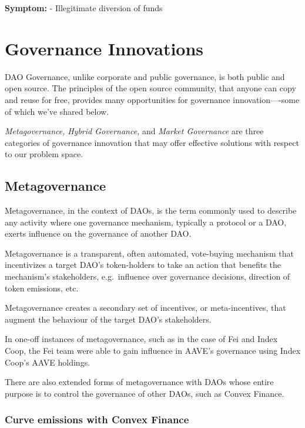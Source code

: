 \documentclass[
]{article}
\begin{document}
\textbf{Symptom:} - Illegitimate diversion of funds
\hypertarget{governance-innovations}{%
\section{Governance Innovations}\label{governance-innovations}}

DAO Governance, unlike corporate and public governance, is both public
and open source. The principles of the open source community, that
anyone can copy and reuse for free, provides many opportunities for
governance innovation----some of which we've shared below.

\emph{Metagovernance,} \emph{Hybrid Governance,} and \emph{Market
Governance} are three categories of governance innovation that may offer
effective solutions with respect to our problem space.

\hypertarget{metagovernance}{%
\subsection{Metagovernance}\label{metagovernance}}

Metagovernance, in the context of DAOs, is the term commonly used to
describe any activity where one governance mechanism, typically a
protocol or a DAO, exerts influence on the governance of another DAO.

Metagovernance is a transparent, often automated, vote-buying mechanism
that incentivizes a target DAO's token-holders to take an action that
benefits the mechanism's stakeholders, e.g.~influence over governance
decisions, direction of token emissions, etc.

Metagovernance creates a secondary set of incentives, or
meta-incentives, that augment the behaviour of the target DAO's
stakeholders.

In one-off instances of metagovernance, such as in the case of Fei and
Index Coop, the Fei team were able to gain influence in AAVE's
governance using Index Coop's AAVE holdings.

There are also extended forms of metagovernance with DAOs whose entire
purpose is to control the governance of other DAOs, such as Convex
Finance.

\hypertarget{curve-emissions-with-convex-finance}{%
\subsubsection{Curve emissions with Convex
Finance}\label{curve-emissions-with-convex-finance}}
\end{document}
